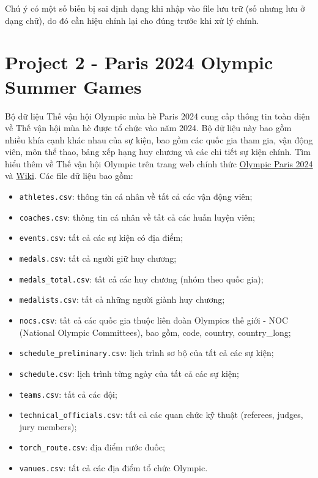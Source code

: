 \documentclass[12pt]{article}
\theoremstyle{definition} \newtheorem{exercise}[theorem]{\bf Bài tập}
\begin{document}
Chú ý có một số biến bị sai định dạng khi nhập vào file lưu trữ (số nhưng lưu ở dạng chữ), do đó cần hiệu chỉnh lại cho đúng trước khi xử lý chính.

\section*{Project 2 - Paris 2024 Olympic Summer Games}
Bộ dữ liệu Thế vận hội Olympic mùa hè Paris 2024 cung cấp thông tin toàn diện về Thế vận hội mùa hè được tổ chức vào năm 2024. Bộ dữ liệu này bao gồm nhiều khía cạnh khác nhau của sự kiện, bao gồm các quốc gia tham gia, vận động viên, môn thể thao, bảng xếp hạng huy chương và các chi tiết sự kiện chính. Tìm hiểu thêm về Thế vận hội Olympic trên trang web chính thức \href{https://olympics.com/en/paris-2024}{Olympic Paris 2024} và \href{https://en.wikipedia.org/wiki/2024_Summer_Olympics}{Wiki}. Các file dữ liệu bao gồm:
\begin{itemize}
\item \texttt{athletes.csv}: thông tin cá nhân về tất cả các vận động viên;
\item \texttt{coaches.csv}: thông tin cá nhân về tất cả các huấn luyện viên;
\item \texttt{events.csv}: tất cả các sự kiện có địa điểm;
\item \texttt{medals.csv}: tất cả người giữ huy chương;
\item \texttt{medals\_total.csv}: tất cả các huy chương (nhóm theo quốc gia);
\item \texttt{medalists.csv}: tất cả những người giành huy chương;
\item \texttt{nocs.csv}: tất cả các quốc gia thuộc liên đoàn Olympics thế giới - NOC (National Olympic Committees), bao gồm, code, country, country\_long;
\item \texttt{schedule\_preliminary.csv}: lịch trình sơ bộ của tất cả các sự kiện;
\item \texttt{schedule.csv}: lịch trình từng ngày của tất cả các sự kiện; 
\item \texttt{teams.csv}: tất cả các đội;
\item \texttt{technical\_officials.csv}: tất cả các quan chức kỹ thuật (referees, judges, jury members);
\item \texttt{torch\_route.csv}: địa điểm rước đuốc;
\item \texttt{vanues.csv}: tất cả các địa điểm tổ chức Olympic.
\end{itemize}
\end{document}
